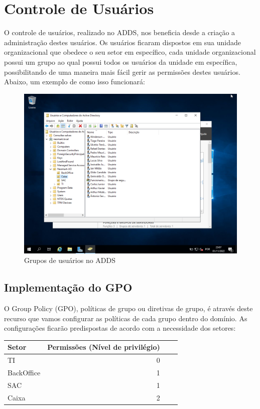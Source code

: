 \documentclass[12pt]{article}
\begin{document}
\section{Controle de Usuários}
O controle de usuários, realizado no ADDS, nos beneficia desde a criação a administração destes usuários. Os usuários ficaram dispostos em sua unidade organizacional que obedece o seu setor em específico, cada unidade organizacional possui um grupo ao qual possui todos os usuários da unidade em específica, possibilitando de uma maneira mais fácil gerir as permissões destes usuários. Abaixo, um exemplo de como isso funcionará:

\begin{figure}[ht]
\centering
\includegraphics[height=0.5\textwidth]{adds-unidades-usuarios.png}
\caption{Grupos de usuários no ADDS}
\label{fig:adds-pastas}
\end{figure}

\subsection{Implementação do GPO}
O Group Policy (GPO), políticas de grupo ou diretivas de grupo, é através deste recurso que vamos configurar as políticas de cada grupo dentro do domínio. As configurações ficarão predispostas de acordo com a necessidade dos setores:

\begin{center}
\begin{tabular}{| l | r | r | r |}
\hline
Setor & Permissões (Nível de privilégio)\\
\hline
TI & 0\\
BackOffice & 1\\
SAC & 1\\
Caixa & 2\\ 
\hline
\end{tabular}
\end{center}
\end{document}
